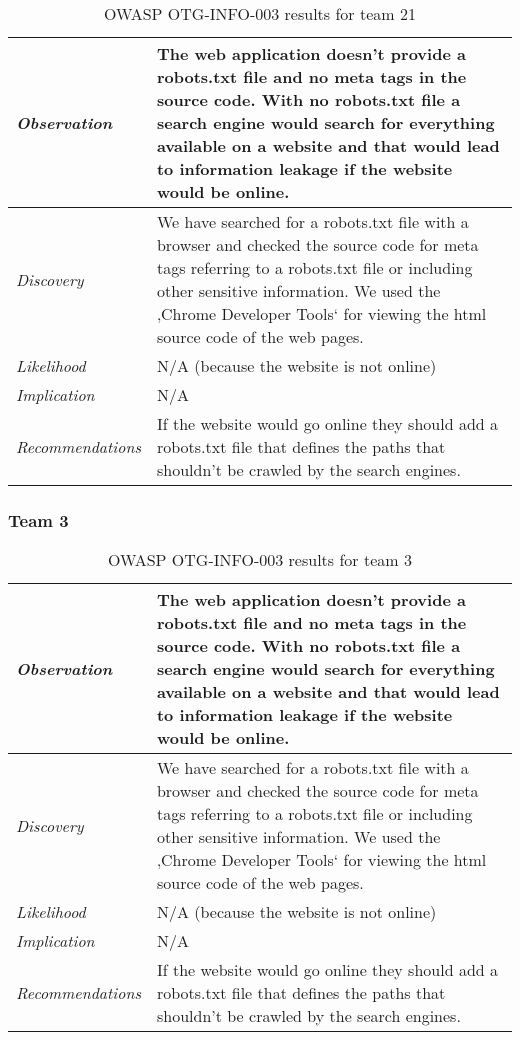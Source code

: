 \documentclass[headsepline,footsepline,footinclude=false,oneside,fontsize=11pt,paper=a4,listof=totoc,bibliography=totoc]{scrbook} %
\begin{document}
\begin{table}[H]
\centering
 \begin{tabular}{l p{11cm}} 
 \textit{Observation} & The web application doesn’t provide a robots.txt file and no meta tags in the source code. With no robots.txt file a search engine would search for everything available on a website and that would lead to information leakage if the website would be online.\\ 
 \hline
 \textit{Discovery} & We have searched for a robots.txt file with a browser and checked the source code for meta tags referring to a robots.txt file or including other sensitive information. We used the ‚Chrome Developer Tools‘ for viewing the html source code of the web pages. \\
 \hline
 \textit{Likelihood} & N/A (because the website is not online)\\
 \hline
 \textit{Implication} & N/A\\
 \hline
 \textit{Recommendations} & If the website would go online they should add a robots.txt file that defines the paths that shouldn’t be crawled by the search engines.\\ 
\end{tabular}
\caption{OWASP OTG-INFO-003 results for team 21}
\label{table:scenario2}
\end{table}

\subsubsection{Team 3}

\begin{table}[H]
\centering
 \begin{tabular}{l p{11cm}} 
 \textit{Observation} & The web application doesn’t provide a robots.txt file and no meta tags in the source code. With no robots.txt file a search engine would search for everything available on a website and that would lead to information leakage if the website would be online.\\ 
 \hline
 \textit{Discovery} & We have searched for a robots.txt file with a browser and checked the source code for meta tags referring to a robots.txt file or including other sensitive information. We used the ‚Chrome Developer Tools‘ for viewing the html source code of the web pages. \\
 \hline
 \textit{Likelihood} & N/A (because the website is not online)\\
 \hline
 \textit{Implication} & N/A\\
 \hline
 \textit{Recommendations} & If the website would go online they should add a robots.txt file that defines the paths that shouldn’t be crawled by the search engines.\\ 
\end{tabular}
\caption{OWASP OTG-INFO-003 results for team 3}
\label{table:scenario2}
\end{table}
\end{document}
